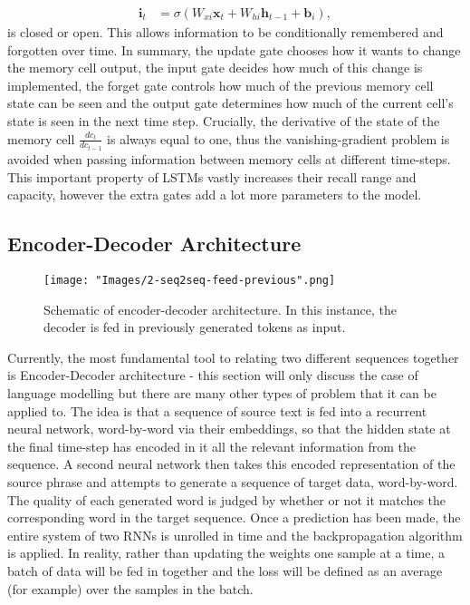 \documentclass[]{article}
\begin{document}
\begin{align}
\textbf{i}_{t}&=\sigma(W_{xi}\textbf{x}_t+W_{hi}\textbf{h}_{t-1}+\textbf{b}_i),
\end{align}
is closed or open. This allows information to be conditionally remembered and forgotten over time. In summary, the update gate chooses how it wants to change the memory cell output, the input gate decides how much of this change is implemented, the forget gate controls how much of the previous memory cell state can be seen and the output gate determines how much of the current cell's state is seen in the next time step.  Crucially, the derivative of the state of the memory cell $\frac{dc_t}{dc_{t-1}}$ is always equal to one, thus the vanishing-gradient problem is avoided when passing information between memory cells at different time-steps. This important property of LSTMs vastly increases their recall range and capacity, however the extra gates add a lot more parameters to the model. 

\subsection{Encoder-Decoder Architecture}
\begin{figure}	\centering
	\texttt{[image: "Images/2-seq2seq-feed-previous".png]}
	\caption{Schematic of encoder-decoder architecture. In this instance, the decoder is fed in previously generated tokens as input.  }
	\label{fig:encoder-decoder}
\end{figure}
Currently, the most fundamental tool to relating two different sequences together is Encoder-Decoder architecture - this section will only discuss the case of language modelling but there are many other types of problem that it can be applied to. The idea is that a sequence of source text is fed into a recurrent neural network, word-by-word via their embeddings, so that the hidden state at the final time-step has encoded in it all the relevant information from the sequence. A second neural network then takes this encoded representation of the source phrase and attempts to generate a sequence of target data, word-by-word. The quality of each generated word is judged by whether or not it matches the corresponding word in the target sequence. Once a prediction has been made, the entire system of two RNNs is unrolled in time and the backpropagation algorithm is applied. In reality, rather than updating the weights one sample at a time, a batch of data will be fed in together and the loss will be defined as an average (for example) over the samples in the batch. 
\end{document}
